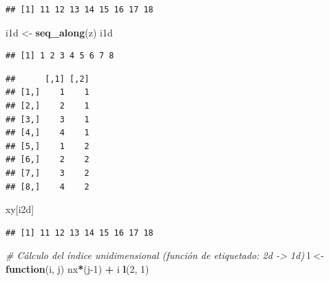 \documentclass[
]{book}
\newenvironment{Shaded}{\begin{snugshade}}{\end{snugshade}}
\newcommand{\CommentTok}[1]{\textcolor[rgb]{0.56,0.35,0.01}{\textit{#1}}}
\newcommand{\ControlFlowTok}[1]{\textcolor[rgb]{0.13,0.29,0.53}{\textbf{#1}}}
\newcommand{\DecValTok}[1]{\textcolor[rgb]{0.00,0.00,0.81}{#1}}
\newcommand{\KeywordTok}[1]{\textcolor[rgb]{0.13,0.29,0.53}{\textbf{#1}}}
\newcommand{\NormalTok}[1]{#1}
\newcommand{\OperatorTok}[1]{\textcolor[rgb]{0.81,0.36,0.00}{\textbf{#1}}}
\newcommand{\StringTok}[1]{\textcolor[rgb]{0.31,0.60,0.02}{#1}}
\theoremstyle{break}
\theoremstyle{definition}
\theoremstyle{definition}
\theoremstyle{definition}
\theoremstyle{remark}
\begin{document}
\begin{verbatim}
## [1] 11 12 13 14 15 16 17 18
\end{verbatim}

\begin{Shaded}
\begin{Highlighting}[]
\NormalTok{i1d <-}\StringTok{ }\KeywordTok{seq_along}\NormalTok{(z)}
\NormalTok{i1d }
\end{Highlighting}
\end{Shaded}

\begin{verbatim}
## [1] 1 2 3 4 5 6 7 8
\end{verbatim}

\begin{Shaded}
\end{Shaded}

\begin{verbatim}
##      [,1] [,2]
## [1,]    1    1
## [2,]    2    1
## [3,]    3    1
## [4,]    4    1
## [5,]    1    2
## [6,]    2    2
## [7,]    3    2
## [8,]    4    2
\end{verbatim}

\begin{Shaded}
\begin{Highlighting}[]
\NormalTok{xy[i2d]}
\end{Highlighting}
\end{Shaded}

\begin{verbatim}
## [1] 11 12 13 14 15 16 17 18
\end{verbatim}

\begin{Shaded}
\begin{Highlighting}[]
\CommentTok{# Cálculo del índice unidimensional (función de etiquetado: 2d -> 1d)}
\NormalTok{l <-}\StringTok{ }\ControlFlowTok{function}\NormalTok{(i, j) nx}\OperatorTok{*}\NormalTok{(j}\DecValTok{-1}\NormalTok{) }\OperatorTok{+}\StringTok{ }\NormalTok{i}
\KeywordTok{l}\NormalTok{(}\DecValTok{2}\NormalTok{, }\DecValTok{1}\NormalTok{)}
\end{Highlighting}
\end{Shaded}
\end{document}
